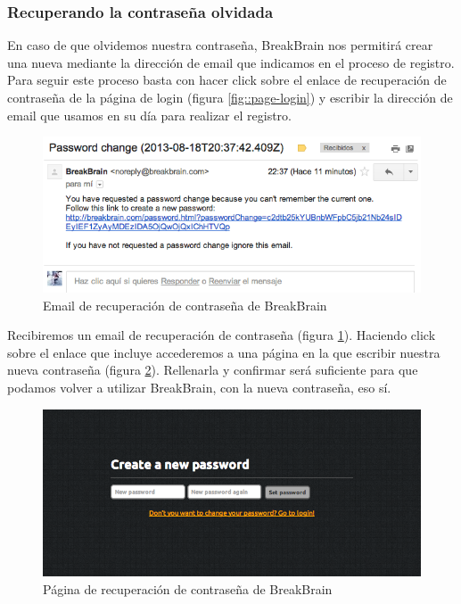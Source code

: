 \subsubsection{Recuperando la contraseña olvidada}

En caso de que olvidemos nuestra contraseña, BreakBrain nos permitirá crear una nueva mediante la dirección de email que indicamos en el proceso de registro. Para seguir este proceso basta con hacer click sobre el enlace de recuperación de contraseña de la página de login (figura \ref{fig::page-login}) y escribir la dirección de email que usamos en su día para realizar el registro.

\begin{figure}[h]
  \begin{center}
    \includegraphics[width=\textwidth]{./images/password-change.png}
  \end{center}  
  \caption{Email de recuperación de contraseña de BreakBrain}
  \label{fig::recover-email}
\end{figure}

Recibiremos un email de recuperación de contraseña (figura \ref{fig::recover-email}). Haciendo click sobre el enlace que incluye accederemos a una página en la que escribir nuestra nueva contraseña (figura \ref{fig::recover-pass}). Rellenarla y confirmar será suficiente para que podamos volver a utilizar BreakBrain, con la nueva contraseña, eso sí.

\begin{figure}[h]
  \begin{center}
    \includegraphics[width=\textwidth]{./images/page-password.png}
  \end{center}  
  \caption{Página de recuperación de contraseña de BreakBrain}
  \label{fig::recover-pass}
\end{figure}

